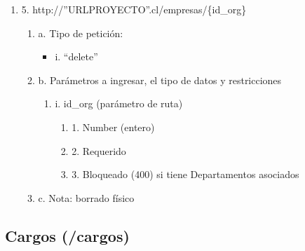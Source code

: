\begin{enumerate}
    \item 5. http://”URLPROYECTO”.cl/empresas/\{id\_org\}
    \begin{enumerate}
        \item a. Tipo de petición:
            \begin{itemize}
               \item i. “delete”
            \end{itemize}
        \item b. Parámetros a ingresar, el tipo de datos y restricciones
            \begin{enumerate}
                \item i. id\_org (parámetro de ruta)
                    \begin{enumerate}
                        \item 1. Number (entero)
                        \item 2. Requerido
                        \item 3. Bloqueado (400) si tiene Departamentos asociados
                    \end{enumerate}
            \end{enumerate}
        \item c. Nota: borrado físico
    \end{enumerate}
\end{enumerate}

\subsection{Cargos (/cargos)}

